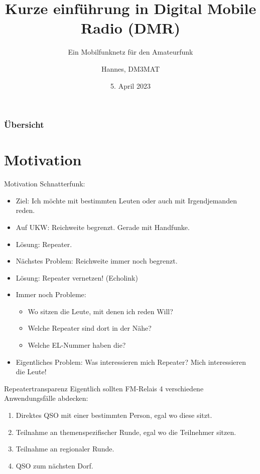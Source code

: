 \documentclass[aspectratio=169]{beamer}
\title[DMR]{Kurze einführung in Digital Mobile Radio (DMR)}
\subtitle{Ein Mobilfunknetz für den Amateurfunk}
\author{Hannes, DM3MAT}
\institute{\texttt{dm3mat [at] darc [dot] de}}
\date{5. April 2023}
\begin{document}
\begin{frame}
 \titlepage
\end{frame}

\begin{frame} \frametitle{Übersicht}
 \tableofcontents
\end{frame}


\section{Motivation}
\begin{frame}{Motivation}
Schnatterfunk:
\begin{itemize}
 \item Ziel: Ich möchte mit bestimmten Leuten oder auch mit Irgendjemanden reden.
 \pause\item Auf UKW: Reichweite begrenzt. Gerade mit Handfunke.
 \pause\item Lösung: Repeater.
 \pause\item Nächstes Problem: Reichweite immer noch begrenzt.
 \pause\item Lösung: Repeater vernetzen! (Echolink)
 \pause\item Immer noch Probleme: 
 \begin{itemize}
  \pause\item Wo sitzen die Leute, mit denen ich reden Will?
  \pause\item Welche Repeater sind dort in der Nähe?
  \pause\item Welche EL-Nummer haben die? 
 \end{itemize}
 \pause\item Eigentliches Problem: Was interessieren mich Repeater? Mich interessieren die Leute!
\end{itemize}
\end{frame}

\begin{frame}{Repeatertransparenz}
Eigentlich sollten FM-Relais 4 verschiedene Anwendungsfälle abdecken:
\begin{enumerate}
 \pause\item Direktes QSO mit einer bestimmten Person, egal wo diese sitzt. \pause\Sadey
 \pause\item Teilnahme an themenspezifischer Runde, egal wo die Teilnehmer sitzen. \pause\Neutrey
 \pause\item Teilnahme an regionaler Runde. \pause\Neutrey
 \pause\item QSO zum nächsten Dorf. \pause\Smiley
\end{enumerate}
\end{frame}
\end{document}
